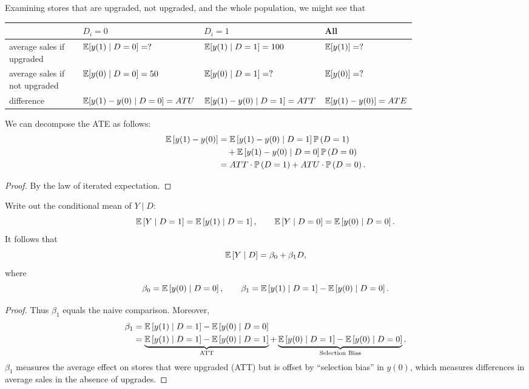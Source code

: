\begin{remark}    Examining stores that are upgraded, not upgraded, and the whole population, we might see that
	\begin{center}
		\scriptsize
		\renewcommand{\arraystretch}{1.15}
		\begin{tabular}{p{0.24\linewidth}p{0.18\linewidth}p{0.18\linewidth}p{0.18\linewidth}}
			& $D_i = 0$ & $D_i = 1$ & All \\
			\hline
			average sales if upgraded
				& $\mathbb{E}[y(1)\mid D=0]=?$ 
				& $\mathbb{E}[y(1)\mid D=1]=100$
				& $\mathbb{E}[y(1)]=?$ \\
			average sales if not upgraded
				& $\mathbb{E}[y(0)\mid D=0]=50$
				& $\mathbb{E}[y(0)\mid D=1]=?$
				& $\mathbb{E}[y(0)]=?$ \\
			difference
				& $\mathbb{E}[y(1)-y(0)\mid D=0]=ATU$
				& $\mathbb{E}[y(1)-y(0)\mid D=1]=ATT$
				& $\mathbb{E}[y(1)-y(0)]=ATE$
		\end{tabular}
	\end{center}
\end{remark}

\begin{proposition}
	We can decompose the ATE as follows:
		\begin{align*}
			\mathbb{E}\left[y(1)-y(0)\right]
			&= \mathbb{E}\left[y(1)-y(0) \mid D=1\right]\mathbb{P}\left(D=1\right) \\
			&\quad + \mathbb{E}\left[y(1)-y(0) \mid D=0\right]\mathbb{P}\left(D=0\right) \\
			&= ATT \cdot \mathbb{P}\left(D=1\right) + ATU \cdot \mathbb{P}\left(D=0\right)
		.\end{align*}
\end{proposition}
\begin{proof}
	By the law of iterated expectation.
\end{proof}

\begin{proposition}
	Write out the conditional mean of $Y \mid D$:
	\[
		\mathbb{E}\left[Y \mid D=1\right] = \mathbb{E}\left[y(1) \mid D=1\right], \qquad
		\mathbb{E}\left[Y \mid D=0\right] = \mathbb{E}\left[y(0) \mid D=0\right]
	.\]
	It follows that
	\[
		\mathbb{E}\left[Y \mid D\right] = \beta_0 + \beta_1 D
	,\]
	where
	\[
		\beta_0 = \mathbb{E}\left[y(0) \mid D=0\right], \qquad
		\beta_1 = \mathbb{E}\left[y(1) \mid D=1\right] - \mathbb{E}\left[y(0) \mid D=0\right]
	.\]
\end{proposition}
\begin{proof}
	Thus $\beta_1$ equals the naive comparison. Moreover,
	\begin{align*}
		\beta_1
		&= \mathbb{E}\left[y(1) \mid D=1\right] - \mathbb{E}\left[y(0) \mid D=0\right] \\
		&= \underbrace{\mathbb{E}\left[y(1) \mid D=1\right] - \mathbb{E}\left[y(0) \mid D=1\right]}_{\text{ATT}}
		+ \underbrace{\mathbb{E}\left[y(0) \mid D=1\right] - \mathbb{E}\left[y(0) \mid D=0\right]}_{\text{Selection Bias}}
	.\end{align*}
		$\beta_1$ measures the average effect on stores that were upgraded (ATT) but is offset by ``selection bias'' in $y(0)$, which measures differences in average sales in the absence of upgrades.
\end{proof}

